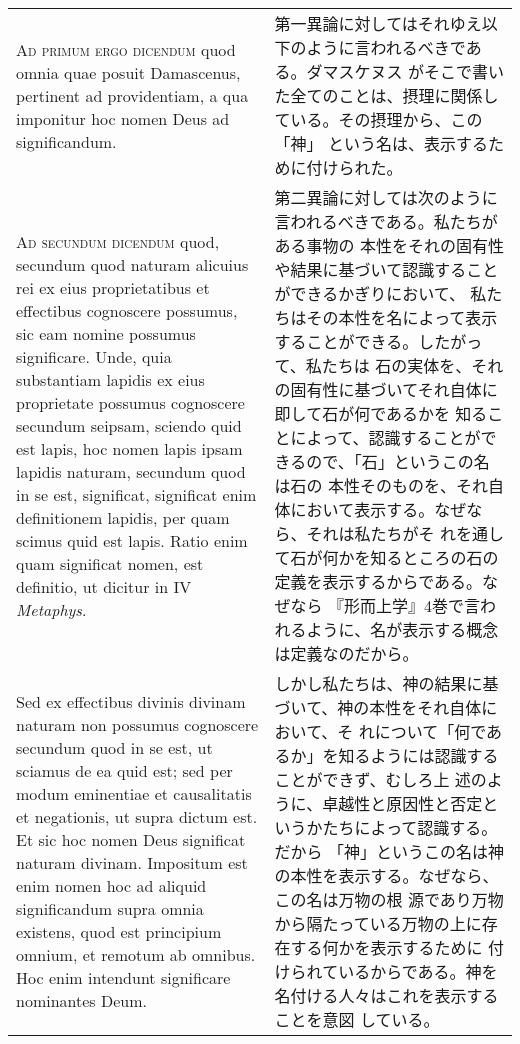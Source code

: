 \documentclass[10pt]{jsarticle} %
\begin{document}
\begin{longtable}{p{21em}p{21em}}
\\



{\scshape Ad primum ergo dicendum} quod omnia quae
posuit Damascenus, pertinent ad providentiam, a qua imponitur hoc nomen
Deus ad significandum.

&

第一異論に対してはそれゆえ以下のように言われるべきである。ダマスケヌス
がそこで書いた全てのことは、摂理に関係している。その摂理から、この「神」
という名は、表示するために付けられた。

\\



{\scshape Ad secundum dicendum} quod, secundum quod naturam alicuius
rei ex eius proprietatibus et effectibus cognoscere possumus, sic eam
nomine possumus significare. Unde, quia substantiam lapidis ex eius
proprietate possumus cognoscere secundum seipsam, sciendo quid est
lapis, hoc nomen lapis ipsam lapidis naturam, secundum quod in se est,
significat, significat enim definitionem lapidis, per quam scimus quid
est lapis.  Ratio enim quam significat nomen, est definitio, ut
dicitur in IV {\itshape Metaphys}.

&

第二異論に対しては次のように言われるべきである。私たちがある事物の
本性をそれの固有性や結果に基づいて認識することができるかぎりにおいて、
私たちはその本性を名によって表示することができる。したがって、私たちは
石の実体を、それの固有性に基づいてそれ自体に即して石が何であるかを
知ることによって、認識することができるので、「石」というこの名は石の
本性そのものを、それ自体において表示する。なぜなら、それは私たちがそ
れを通して石が何かを知るところの石の定義を表示するからである。なぜなら
『形而上学』4巻で言われるように、名が表示する概念は定義なのだから。

\\

Sed ex effectibus divinis divinam naturam non possumus cognoscere
secundum quod in se est, ut sciamus de ea quid est; sed per modum
eminentiae et causalitatis et negationis, ut supra dictum est. Et sic
hoc nomen Deus significat naturam divinam. Impositum est enim nomen
hoc ad aliquid significandum supra omnia existens, quod est principium
omnium, et remotum ab omnibus. Hoc enim intendunt significare
nominantes Deum.

&

しかし私たちは、神の結果に基づいて、神の本性をそれ自体において、そ
れについて「何であるか」を知るようには認識することができず、むしろ上
述のように、卓越性と原因性と否定というかたちによって認識する。だから
「神」というこの名は神の本性を表示する。なぜなら、この名は万物の根
源であり万物から隔たっている万物の上に存在する何かを表示するために
付けられているからである。神を名付ける人々はこれを表示することを意図
している。



\end{longtable}
\newpage
{}
\end{document}
